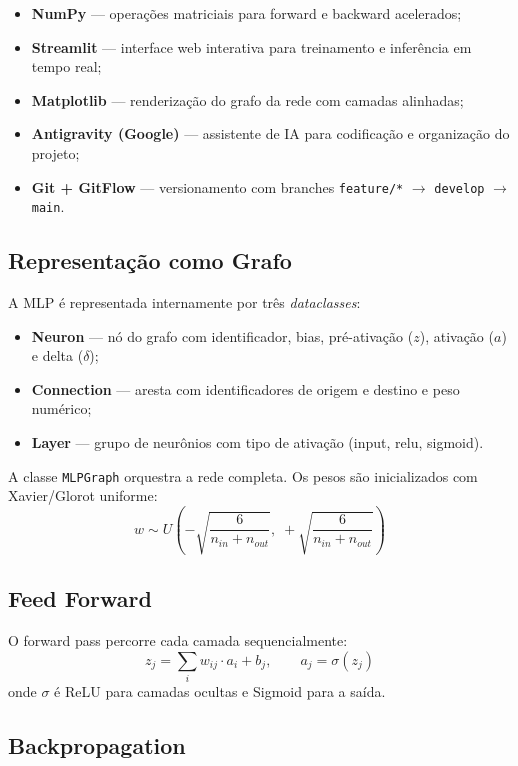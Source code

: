 \documentclass[runningheads]{llncs}
\begin{document}
\begin{itemize}
    \item \textbf{NumPy} — operações matriciais para forward e backward
          acelerados;
    \item \textbf{Streamlit} — interface web interativa para
          treinamento e inferência em tempo real;
    \item \textbf{Matplotlib} — renderização do grafo da rede com
          camadas alinhadas;
    \item \textbf{Antigravity (Google)} — assistente de IA para
          codificação e organização do projeto;
    \item \textbf{Git + GitFlow} — versionamento com branches
          \texttt{feature/*} $\to$ \texttt{develop} $\to$ \texttt{main}.
\end{itemize}

\subsection{Representação como Grafo}

A MLP é representada internamente por três \textit{dataclasses}:

\begin{itemize}
    \item \textbf{Neuron} — nó do grafo com identificador, bias,
          pré-ativação ($z$), ativação ($a$) e delta ($\delta$);
    \item \textbf{Connection} — aresta com identificadores de origem
          e destino e peso numérico;
    \item \textbf{Layer} — grupo de neurônios com tipo de ativação
          (input, relu, sigmoid).
\end{itemize}

A classe \texttt{MLPGraph} orquestra a rede completa. Os pesos são
inicializados com Xavier/Glorot uniforme:
\[
w \sim U\left(-\sqrt{\frac{6}{n_{in}+n_{out}}},\;
+\sqrt{\frac{6}{n_{in}+n_{out}}}\right)
\]

\subsection{Feed Forward}

O forward pass percorre cada camada sequencialmente:
\[
z_j = \sum_i w_{ij} \cdot a_i + b_j, \qquad
a_j = \sigma(z_j)
\]
onde $\sigma$ é ReLU para camadas ocultas e Sigmoid para a saída.

\subsection{Backpropagation}
\end{document}
